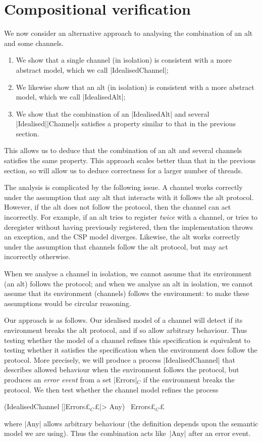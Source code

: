 \section{Compositional verification}
\label{sec:compositional}

\inlineCSP

We now consider an alternative approach to analysing the combination of an alt
and some channels.  
%
\begin{enumerate}
\item We show that a single channel (in isolation) is consistent with a more
  abstract model, which we call |IdealisedChannel|;

\item We likewise show that an alt (in isolation) is consistent with a more
  abstract model, which we call |IdealisedAlt|;

\item We show that the combination of an |IdealisedAlt| and several
  |Idealised|\-|Channel|s satisfies a property similar to that in the previous
  section. 
\end{enumerate}
%
This allows us to deduce that the combination of an alt and several channels
satisfies the same property. This approach scales better than that in the
previous section, so will allow us to deduce correctness for a larger number
of threads.

The analysis is complicated by the following issue.  A channel works correctly
under the assumption that any alt that interacts with it follows the alt
protocol.  However, if the alt does not follow the protocol, then the channel
can act incorrectly.  For example, if an alt tries to register \emph{twice}
with a channel, or tries to deregister without having previously registered,
then the implementation throws an exception, and the CSP model diverges.
Likewise, the alt works correctly under the assumption that channels follow
the alt protocol, but may act incorrectly otherwise.

When we analyse a channel in isolation, we cannot assume that its environment
(an alt) follows the protocol; and when we analyse an alt in isolation, we
cannot assume that its environment (channels) follows the environment: to make
these assumptions would be circular reasoning. 

Our approach is as follows.  Our idealised model of a channel will detect if
its environment breaks the alt protocol, and if so allow arbitrary behaviour.
Thus testing whether the model of a channel refines this specification is
equivalent to testing whether it satisfies the specification when the
environment does follow the protocol.  More precisely, we will produce a
process |IdealisedChannel| that describes allowed behaviour when the environment
follows the protocol, but produces an \emph{error event} from a set
|Errors|$_C$ if the environment breaks the protocol.  We then test whether the
channel model refines the process
%
\begin{cspm}
(IdealisedChannel [|Errors£$_C$£|> Any) \ Errors£$_C$£
\end{cspm}
%
where |Any| allows arbitrary behaviour (the definition depends upon the
semantic model we are using).  Thus the combination acts like~|Any| after an
error event. 

